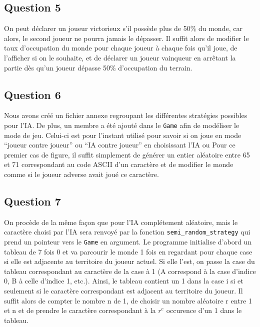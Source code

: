 \documentclass{article}
\begin{document}
\subsection{Question 5}
    On peut déclarer un joueur victorieux s'il possède plus de 50\% du monde, car alors, le second joueur ne pourra jamais le dépasser. Il suffit alors de modifier le taux d'occupation du monde pour chaque joueur à chaque fois qu'il joue, de l'afficher si on le souhaite, et de déclarer un joueur vainqueur en arrêtant la partie dès qu'un joueur dépasse 50\% d'occupation du terrain.
\subsection{Question 6}
    Nous avons créé un fichier annexe regroupant les différentes stratégies possibles pour l'IA. De plus, un membre a été ajouté dans le \texttt{Game} afin de modéliser le mode de jeu. Celui-ci est pour l'instant utilisé pour savoir si on joue en mode \enquote{joueur contre joueur} ou \enquote{IA contre joueur} en choisissant l'IA ou Pour ce premier cas de figure, il suffit simplement de générer un entier aléatoire entre 65 et 71 correspondant au code ASCII d'un caractère et de modifier le monde comme si le joueur adverse avait joué ce caractère.
\subsection{Question 7}
    On procède de la même façon que pour l'IA complétement aléatoire, mais le caractère choisi par l'IA sera renvoyé par la fonction \texttt{semi\_random\_strategy} qui prend un pointeur vers le \texttt{Game} en argument. Le programme initialise d'abord un tableau de 7 fois 0 et va parcourir le monde 1 fois en regardant pour chaque case si elle est adjacente au territoire du joueur actuel. Si elle l'est, on passe la case du tableau correspondant au caractère de la case à 1 (A correspond à la case d'indice 0, B à celle d'indice 1, etc.). Ainsi, le tableau contient un 1 dans la case i si et seulement si le caractère correspondant est adjacent au territoire du joueur. Il suffit alors de compter le nombre n de 1, de choisir un nombre aléatoire r entre 1 et n et de prendre le caractère correspondant à la $r^e$ occurence d'un 1 dans le tableau.
\end{document}
